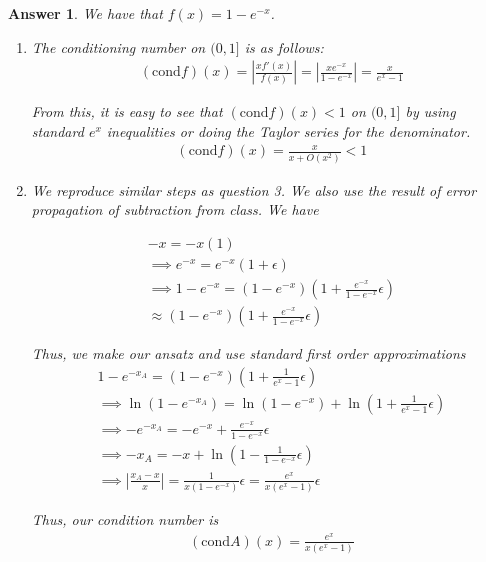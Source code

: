 \documentclass[12pt]{article}
\theoremstyle{colon}
\newtheorem*{answer}{Answer}
\begin{document}
\begin{answer}
  We have that $f(x) = 1 - e^{-x}$.

  \begin{enumerate}[label=\alph*)]

    \item The conditioning number on $(0,1]$ is as follows:
      \begin{gather*}
        (\text{cond} f)(x) = \left\lvert \frac{x f'(x)}{f(x)} \right\rvert = \left\lvert \frac{x e^{-x}}{1 - e^{-x}} \right\rvert = \frac{x}{e^{x}-1}
      \end{gather*}

      From this, it is easy to see that $(\text{cond} f)(x) < 1$ on $(0,1]$ by using standard $e^x$ inequalities or doing the Taylor series for the denominator.
      \begin{gather*}
        (\text{cond} f)(x) = \frac{x}{x + O(x^2)} < 1
      \end{gather*}

    \item We reproduce similar steps as question 3. We also use the result of error propagation of subtraction from class. We have

      \begin{gather*}
        -x = -x(1) \\
        \implies e^{-x} = e^{-x}(1+\epsilon) \\
        \implies 1 - e^{-x} = (1-e^{-x})(1+\frac{e^{-x}}{1-e^{-x}} \epsilon) \\
        \approx (1-e^{-x})(1 + \frac{e^{-x}}{1-e^{-x}} \epsilon)
      \end{gather*}

      Thus, we make our ansatz and use standard first order approximations
      \begin{gather*}
        1-e^{-x_A} = (1-e^{-x})(1+\frac{1}{e^x-1} \epsilon) \\
        \implies \ln(1 - e^{-x_A}) = \ln(1 - e^{-x}) + \ln(1 + \frac{1}{e^x-1} \epsilon) \\
        \implies -e^{-x_A} = -e^{-x} + \frac{e^{-x}}{1-e^{-x}} \epsilon \\
        \implies -x_A = -x + \ln(1-\frac{1}{1-e^{-x}} \epsilon) \\
        \implies \left\lvert \frac{x_A - x}{x} \right\rvert = \frac{1}{x(1-e^{-x})} \epsilon = \frac{e^x}{x(e^x-1)} \epsilon
      \end{gather*}

      Thus, our condition number is
      \begin{gather*}
        (\text{cond} A)(x) = \frac{e^x}{x(e^x-1)}
      \end{gather*}


\end{enumerate}
\end{answer}
\end{document}
